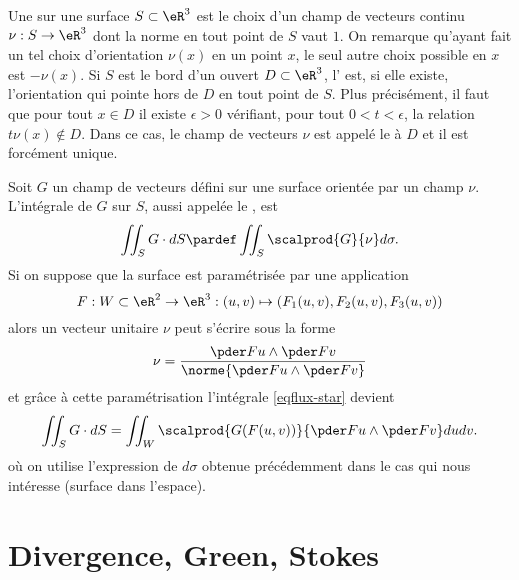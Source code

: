 Une  sur une surface $S \subset \eR^3$ est le choix
d'un champ de vecteurs continu $\nu : S \to \eR^3$ dont la norme en
tout point de $S$ vaut $1$. On remarque qu'ayant fait un tel choix
d'orientation $\nu(x)$ en un point $x$, le seul autre choix possible
en $x$ est $-\nu(x)$.
Si $S$ est le bord d'un ouvert $D \subset \eR^3$, l' est, si elle existe, l'orientation qui
pointe hors de $D$ en tout point de $S$. Plus précisément, il faut que
pour tout $x \in D$ il existe $\epsilon > 0$ vérifiant, pour tout $0 <
t < \epsilon$, la relation $t \nu(x) \notin D$. Dans ce cas, le champ
de vecteurs $\nu$ est appelé le  à $D$ et il est forcément unique.

Soit $G$ un champ de vecteurs défini sur une surface orientée par un
champ $\nu$. L'intégrale de $G$ sur $S$, aussi appelée le , est
\begin{equation}\label{eqflux-star}
  \iint_S G \cdot d S \pardef \iint_S \scalprod{G}{\nu} d \sigma.
\end{equation}
Si on suppose que la surface est paramétrisée par une application
\begin{equation*}
  F : W \subset \eR^2 \to \eR^3 : (u,v) \mapsto (F_1(u,v),F_2(u,v),F_3(u,v))
\end{equation*}
alors un vecteur unitaire $\nu$ peut s'écrire sous la forme
\begin{equation*}
  \nu = \frac{\pder F u \wedge \pder F v}{\norme{\pder F u \wedge \pder F v}}
\end{equation*}
et grâce à cette paramétrisation l'intégrale \eqref{eqflux-star}
devient
\begin{equation*}
  \iint_S G \cdot d S = \iint_W \scalprod{G(F(u,v))}{\pder F u \wedge \pder F v} d u
  d v.
\end{equation*}
où on utilise l'expression de $d \sigma$ obtenue précédemment dans le
cas qui nous intéresse (surface dans l'espace).

\section{Divergence, Green, Stokes}


